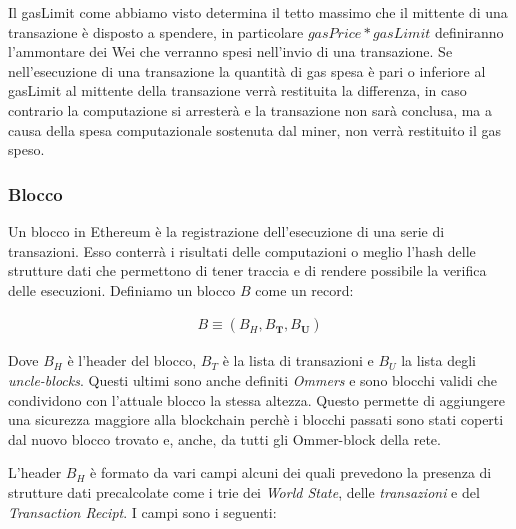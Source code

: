 	Il gasLimit come abbiamo visto determina il tetto massimo che il mittente di una transazione è disposto a spendere, in particolare $gasPrice*gasLimit$ definiranno l'ammontare dei Wei che verranno spesi nell'invio di una transazione.
	Se nell'esecuzione di una transazione la quantità di gas spesa è pari o inferiore al gasLimit al mittente della transazione verrà restituita la differenza, in caso contrario la computazione si arresterà e la transazione non sarà conclusa, ma a causa della spesa computazionale sostenuta dal miner, non verrà restituito il gas speso.
	
	\subsubsection{Blocco}\label{sssec:blocco}
	Un blocco in Ethereum è la registrazione dell'esecuzione di una serie di transazioni. Esso conterrà i risultati delle computazioni o meglio l'hash delle strutture dati che permettono di tener traccia e di rendere possibile la verifica delle esecuzioni. 
	Definiamo un blocco $B$ come un record:
	
	\begin{eqnarray}
	B \equiv (B_H, B_\mathbf{T}, B_\mathbf{U})
	\end{eqnarray}

	Dove $B_H$ è l'header del blocco, $B_T$ è la lista di transazioni e $B_U$ la lista degli \textit{uncle-blocks}. Questi ultimi sono anche definiti \textit{Ommers} e sono blocchi validi che condividono con l'attuale blocco la stessa altezza. Questo permette di aggiungere una sicurezza maggiore alla blockchain perchè i blocchi passati sono stati coperti dal nuovo blocco trovato e, anche, da tutti gli Ommer-block della rete.

	L'header $B_H$ è formato da vari campi alcuni dei quali prevedono la presenza di strutture dati precalcolate come i trie dei \textit{World State}, delle \textit{transazioni} e del \textit{Transaction Recipt}.
	I campi sono i seguenti:
	
